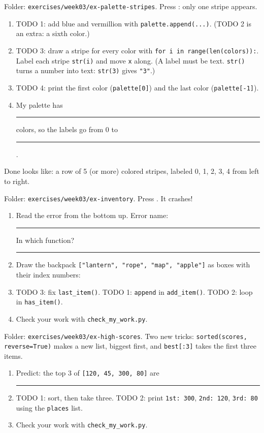 \begin{exercise}
Folder: \texttt{exercises/week03/ex-palette-stripes}. Press : only one stripe appears.
\begin{enumerate}[leftmargin=1.4em]
  \item TODO 1: add blue and vermillion with \texttt{palette.append(...)}. (TODO 2 is an extra: a sixth color.)
  \item TODO 3: draw a stripe for every color with \texttt{for i in range(len(colors)):}. Label each stripe \texttt{str(i)} and move \texttt{x} along.
        (A label must be text. \texttt{str()} turns a number into text: \texttt{str(3)} gives \texttt{"3"}.)
  \item TODO 4: print the first color (\texttt{palette[0]}) and the last color (\texttt{palette[-1]}).
  \item My palette has \rule{1cm}{0.4pt} colors, so the labels go from 0 to \rule{1cm}{0.4pt}.
\end{enumerate}
Done looks like: a row of 5 (or more) colored stripes, labeled 0, 1, 2, 3, 4 from left to right.
\end{exercise}

\begin{exercise}
Folder: \texttt{exercises/week03/ex-inventory}. Press . It crashes!
\begin{enumerate}[leftmargin=1.4em]
  \item Read the error from the bottom up. Error name: \rule{3.5cm}{0.4pt}\quad In which function? \rule{3.5cm}{0.4pt}
  \item Draw the backpack \texttt{["lantern", "rope", "map", "apple"]} as boxes with their index numbers:
  \answerspace{1.4cm}
  \item TODO 3: fix \texttt{last\_item()}. TODO 1: \texttt{append} in \texttt{add\_item()}. TODO 2: loop in \texttt{has\_item()}.
  \item Check your work with \texttt{check\_my\_work.py}.
\end{enumerate}
\end{exercise}

\begin{exercise}
Folder: \texttt{exercises/week03/ex-high-scores}. Two new tricks:
\texttt{sorted(scores, reverse=True)} makes a new list, biggest first, and \texttt{best[:3]} takes the first three items.
\begin{enumerate}[leftmargin=1.4em]
  \item Predict: the top 3 of \texttt{[120, 45, 300, 80]} are \rule{4cm}{0.4pt}
  \item TODO 1: sort, then take three. TODO 2: print \texttt{1st: 300}, \texttt{2nd: 120}, \texttt{3rd: 80} using the \texttt{places} list.
  \item Check your work with \texttt{check\_my\_work.py}.
\end{enumerate}
\end{exercise}

